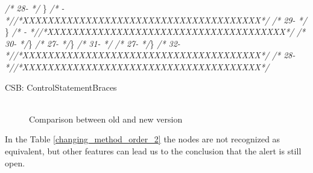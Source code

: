 \documentclass[
]{article}
\newenvironment{Shaded}{\begin{snugshade}}{\end{snugshade}}
\newcommand{\CommentTok}[1]{\textcolor[rgb]{0.56,0.35,0.01}{\textit{#1}}}
\newcommand{\NormalTok}[1]{#1}
\begin{document}
\begin{landscape}
\begin{Shaded}
\begin{Highlighting}[]
\CommentTok{/* 28-   */}\NormalTok{        \}                                                }\CommentTok{/*   -   *//*XXXXXXXXXXXXXXXXXXXXXXXXXXXXXXXXXXXXXX*/}               
\CommentTok{/* 29-   */}\NormalTok{    \}                                                    }\CommentTok{/*   -   *//*XXXXXXXXXXXXXXXXXXXXXXXXXXXXXXXXXXXXXX*/}               
\CommentTok{/* 30-   */}\NormalTok{\}                                                        }\CommentTok{/* 27-   */}\NormalTok{\}                                                        }
\CommentTok{/* 31-   */}                                                         \CommentTok{/* 27-   */}\NormalTok{\}                                                        }
\CommentTok{/* 32-   *//*XXXXXXXXXXXXXXXXXXXXXXXXXXXXXXXXXXXXXX*/}               \CommentTok{/* 28-   *//*XXXXXXXXXXXXXXXXXXXXXXXXXXXXXXXXXXXXXX*/}               


\NormalTok{CSB: ControlStatementBraces}
\end{Highlighting}
\end{Shaded}

\normalsize

\begin{figure}
\centering
\includegraphics{figures/fake.png}
\caption{Comparison between old and new version
\label{comparison_changing_method_order_2}}
\end{figure}

\end{landscape}

\newpage

In the Table \ref{changing_method_order_2} the nodes are not recognized
as equivalent, but other features can lead us to the conclusion that the
alert is still open.

\small
\end{document}
